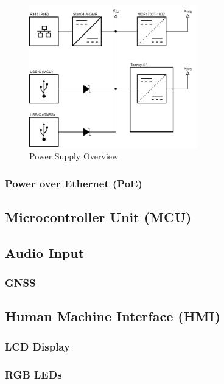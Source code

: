 \begin{figure}
	\centering
	\includegraphics[width=0.65\textwidth]{images/6_design_final/final_design_power_supply.pdf}
	\caption{Power Supply Overview}
	\label{fig:power_supply_overview}
\end{figure}

\subsubsection{Power over Ethernet (PoE)}


\subsection{Microcontroller Unit (MCU)}


\subsection{Audio Input}

\subsubsection{GNSS}

\subsection{Human Machine Interface (HMI)}


\subsubsection{LCD Display}

\subsubsection{RGB LEDs}

